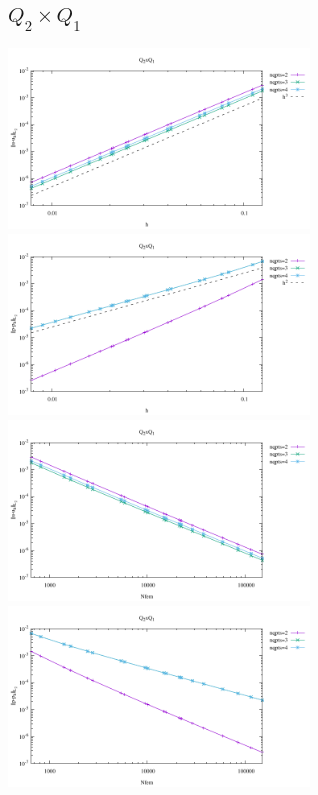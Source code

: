 \subsection*{$Q_2\times Q_1$}

\begin{center}
\includegraphics[width=8cm]{python_codes/fieldstone_120/results/Q2Q1-velocity-h.pdf}
\includegraphics[width=8cm]{python_codes/fieldstone_120/results/Q2Q1-pressure-h.pdf}\\
\includegraphics[width=8cm]{python_codes/fieldstone_120/results/Q2Q1-velocity-Nfem.pdf}
\includegraphics[width=8cm]{python_codes/fieldstone_120/results/Q2Q1-pressure-Nfem.pdf}
\end{center}

